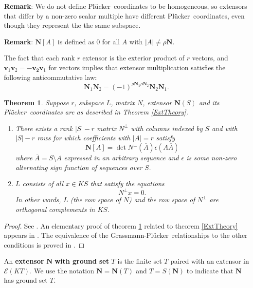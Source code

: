 \documentclass[12pt]{article}
\newtheorem{theorem}{Theorem}[section]
\theoremstyle{definition}
\newcommand{\Remark}{\textbf{Remark}}
\newcommand{\scomp}[1]{\ensuremath{\overline{#1}}}
\newcommand{\FieldK}{\ensuremath{K}}
\newcommand{\Rank}{{\rho}}%
\newcommand{\Card}[1]{\ensuremath{{\left|#1\right|}}}
\newcommand{\ext}[1]{\ensuremath{\mathbf{#1}}}
\newcommand{\Plucker}{Pl\"{u}cker\ }
\begin{document}
\Remark: We do not define \Plucker coordinates to be homogeneous, so 
extensors that differ by a non-zero scalar multiple have different
\Plucker coordinates, even though they represent the 
the same subspace.  

\Remark: $\ext{N}[A]$ is defined as $0$ for all $A$ with 
$\Card{A}\neq\rho\ext{N}$.

The fact that each rank $r$ extensor is the exterior
product of $r$ vectors, and $\ext{v}_1\ext{v}_2=-\ext{v_2}\ext{v}_1$ for 
vectors implies that extensor multiplication satisfies the 
following anticommutative law:
\begin{equation}
\label{Anticommutative}
\ext{N}_1\ext{N}_2=(-1)^{\Rank{\ext{N}_1}\Rank{\ext{N}_2}}
\ext{N}_2\ext{N}_1.
\end{equation}

\begin{theorem}
\label{OrthogSpace}
Suppose $r$, subspace $L$, matrix $N$, extensor $\ext{N}(S)$ and
its \Plucker coordinates are as described in Theorem \ref{ExtTheory}.
\begin{enumerate}
\item There exists a rank $\Card{S}-r$ matrix $N^\perp$ with columns 
indexed by $S$ and with $\Card{S}-r$ rows for which coefficients
with $\Card{A}=r$ satisfy
\[
   \ext{N}[A] = \det N^\perp(\scomp{A})\epsilon(A\scomp{A})
\]
where $\scomp{A}=S\setminus A$ expressed in an arbitrary sequence and
$\epsilon$ is some non-zero alternating sign function of
sequences over $S$.

\item
$L$ consists of all $x\in \FieldK S$ that satisfy the equations
\[
    N^\perp x = 0.
\]
In other words, $L$ (the row space of $N$) and the row space
of $N^\perp$ are orthogonal complements in $\FieldK S$.
\end{enumerate}
\end{theorem}

\begin{proof} 
See \cite[chap. 7]{JacobsonI}.  An elementary proof of 
theorem \ref{OrthogSpace} related to theorem \ref{ExtTheory}
appears in \cite[VII.3 Theorem I]{HodgePedoe1}.  The
equivalence of the Grassmann-\Plucker relationships to
the other conditions is proved in 
\cite[VII.6 Theorem II]{HodgePedoe1}.
\end{proof}

An \textbf{extensor} $\ext{N}$ \textbf{with ground set} $T$ 
is the finite set $T$ paired with an extensor in
$\mathcal{E}(\FieldK T)$.
We use the notation $\ext{N}=\ext{N}(T)$ and $T=S(\ext{N})$ to indicate
that $\ext{N}$ has ground set $T$.  
\end{document}
